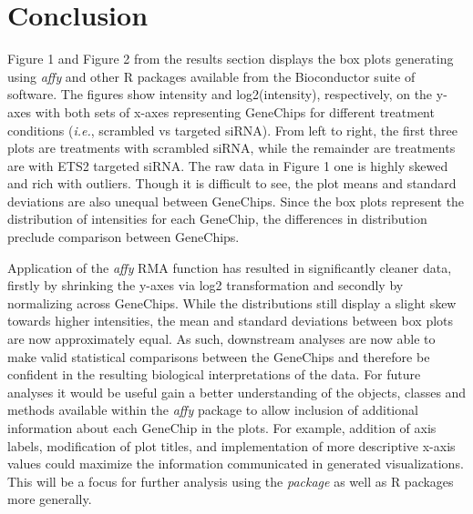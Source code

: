 \documentclass[11 pt,letterpaper]{article}
\begin{document}
\section{Conclusion}

    Figure 1 and Figure 2 from the results section displays the box plots generating using \textit{affy} and other R packages available from the Bioconductor suite of software.
    The figures show intensity and log2(intensity), respectively, on the y-axes with both sets of x-axes representing GeneChips for different treatment conditions (\textit{i.e.}, scrambled vs targeted siRNA).
    From left to right, the first three plots are treatments with scrambled siRNA, while the remainder are treatments are with ETS2 targeted siRNA.
    The raw data in Figure 1 one is highly skewed and rich with outliers.
    Though it is difficult to see, the plot means and standard deviations are also unequal between GeneChips.
    Since the box plots represent the distribution of intensities for each GeneChip, the differences in distribution preclude comparison between GeneChips.
    
    Application of the \textit{affy} RMA function has resulted in significantly cleaner data, firstly by shrinking the y-axes via log2 transformation and secondly by normalizing across GeneChips.
    While the distributions still display a slight skew towards higher intensities, the mean and standard deviations between box plots are now approximately equal. 
    As such, downstream analyses are now able to make valid statistical comparisons between the GeneChips and therefore be confident in the resulting biological interpretations of the data.
    For future analyses it would be useful gain a better understanding of the objects, classes and methods available within the \textit{affy} package to allow inclusion of additional information about each GeneChip in the plots.
    For example, addition of axis labels, modification of plot titles, and implementation of more descriptive x-axis values could maximize the information communicated in generated visualizations.
    This will be a focus for further analysis using the \textit{package} as well as R packages more generally.
\end{document}
